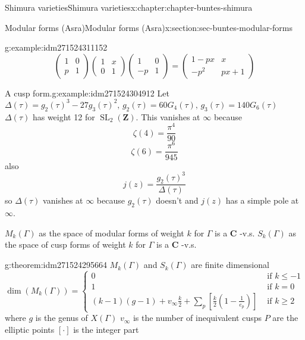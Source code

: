 \documentclass[oneside,10pt,]{book}
\numberwithin{equation}{section}
\newcommand{\lb}{[}
\newcommand{\rb}{]}
\newcommand{\ZZ}{\mathbf{Z}}
\newcommand{\CC}{\mathbf{C}}
\DeclareMathOperator{\SL}{SL}
\newcommand{\amp}{&}
\begin{document}
\begin{chapterptx}{Shimura varieties}{}{Shimura varieties}{}{}{x:chapter:chapter-buntes-shimura}
\begin{sectionptx}{Modular forms (Asra)}{}{Modular forms (Asra)}{}{}{x:section:sec-buntes-modular-forms}
\begin{example}{}{g:example:idm271524311152}
\begin{equation*}
\begin{pmatrix} 1\amp 0 \\ p \amp 1 \end{pmatrix} \begin{pmatrix} 1\amp x \\ 0 \amp 1 \end{pmatrix} \begin{pmatrix} 1\amp 0 \\ -p \amp 1 \end{pmatrix}  = \begin{pmatrix} 1 - px \amp x  \\ -p^2 \amp px+ 1 \end{pmatrix}
\end{equation*}
%
\end{example}
\begin{example}{A cusp form.}{g:example:idm271524304912}%
Let \(\Delta(\tau) = g_2(\tau)^3 - 27g_3(\tau)^2,\,g_2(\tau) = 60G_4(\tau),\,g_3(\tau) =140G_6(\tau)\) \(\Delta(\tau)\) has weight 12 for \(\SL_2(\ZZ)\). This vanishes at \(\infty\) because%
\begin{equation*}
\zeta(4) = \frac{\pi^4}{90}
\end{equation*}
%
\begin{equation*}
\zeta(6) = \frac{\pi^6}{945}
\end{equation*}
also%
\begin{equation*}
j(z) = \frac{g_2(\tau)^3}{\Delta(\tau)}
\end{equation*}
so \(\Delta(\tau)\) vanishes at \(\infty\) because \(g_2(\tau)\) doesn't  and \(j(z)\) has a  simple pole at \(\infty\).%
\end{example}
\(M_k(\Gamma)\) as the space of modular forms of weight \(k\) for \(\Gamma\) is a \(\CC\) -v.s. \(S_k(\Gamma)\) as the space of cusp forms of weight \(k\) for \(\Gamma\) is a \(\CC\) -v.s.%
\begin{theorem}{}{}{g:theorem:idm271524295664}%
\(M_k(\Gamma)\) and \(S_k(\Gamma)\) are finite dimensional%
\begin{equation*}
\dim(M_k(\Gamma)) =
\begin{cases}
0 \amp \text{ if } k \le -1\\
1 \amp \text{ if } k = 0\\
(k-1)(g-1) + v_\infty \frac k2 + \sum_p [\frac k2 (1- \frac{1}{e_p})] \amp \text{ if } k \ge 2
\end{cases}
\end{equation*}
where \(g\) is the genus of \(X(\Gamma)\) \(v_\infty\) is the number of inequivalent cusps \(P\) are the elliptic points \(\lb \cdot \rb\) is the integer part%

\end{theorem}
\end{sectionptx}
\end{chapterptx}
\end{document}
